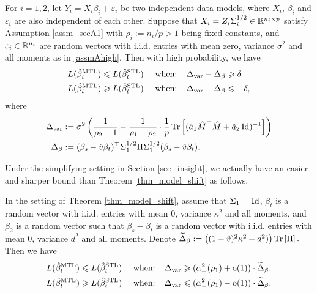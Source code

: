 \begin{theorem}\label{thm_model_shift}
For $i=1,2$, let $Y_i = X_i\beta_i + \varepsilon_i$ be two independent data models, where $X_i$, $\beta_i$ and $\varepsilon_i$ are also independent of each other. Suppose that $X_i=Z_i\Sigma_i^{1/2}\in \mathbb{R}^{n_i\times p}$ satisfy Assumption \ref{assm_secA1} with $\rho_i:=n_i/p>1$ being fixed constants, and ${\varepsilon}_i\in \mathbb{R}^{n_i}$ are random vectors with i.i.d. entries with mean zero, variance $\sigma^2$ and all moments as in \eqref{assmAhigh}. 
	Then with high probability, we have
	\begin{align}
	 	L(\hat{\beta}_{t}^{\text{MTL}}) \leqslant L(\hat{\beta}_t^{\text{STL}}) \quad \text{ when: } \ \ &\Delta_{\text{var}} - \Delta_{\beta} \geqslant   \delta \label{upper}\\
		L(\hat{\beta}_t^{\text{MTL}}) \geqslant L(\hat{\beta}_t^{\text{STL}}) \quad \text{ when: } \ \ &\Delta_{\text{var}} - \Delta_{\beta} \leqslant - \delta, \label{lower}
	\end{align}
	where
	\begin{align} %
		\Delta_{\vari} &\define {\sigma^2}\bigbrace{\frac{1}{\rho_2 - 1} -  \frac{1}{\rho_1 + \rho_2}\cdot \frac1p \bigtr{(\hat a_1 \hat M^{\top}\hat M + \hat a_2\id)^{-1}} } \label{Deltavarv} \\
		\Delta_{\beta} &\define (\beta_s - \hat{v}\beta_t)^{\top} \Sigma_1^{1/2} \Pi \Sigma_1^{1/2} (\beta_s - \hat{v}\beta_t). \label{Deltabetav}
	\end{align}
\end{theorem}

Under the simplifying setting in Section \ref{sec_insight}, we actually have an easier and sharper bound than Theorem \ref{thm_model_shift} as follows. 
\begin{lemma}\label{prop_model_shift_tight}
		In the setting of Theorem \ref{thm_model_shift}, assume that $\Sigma_1 =\operatorname{Id}$,
		$\beta_t$ is a random vector with i.i.d. entries with mean $0$, variance $\kappa^2$ and all moments, and $\beta_2$ is a random vector such that $\beta_s - \beta_t$ is a random vector with i.i.d. entries with mean $0$, variance $d^2$ and all moments. Denote
		$\widetilde \Delta_{\beta} := \left({(1 - \hat{v})^2 \kappa^2 + d^2)}\right) \operatorname{Tr}\left[\Pi\right].$
	Then we have
		\begin{align*}
			L(\hat{\beta}_t^{\text{MTL}}) \leqslant L(\hat{\beta}_t^{\text{STL}})\quad \text{ when: }\ \  & \Delta_{\text{var}} \geqslant  (\alpha_+^2(\rho_1)+\operatorname{o}(1))\cdot \widetilde \Delta_{\beta}, \\
			L(\hat{\beta}_t^{\text{MTL}}) \geqslant L(\hat{\beta}_t^{\text{STL}})\quad \text{ when: }\ \  & \Delta_{\text{var}} \leqslant (\alpha_-^2(\rho_1)-\operatorname{o}(1))\cdot \widetilde\Delta_{\beta}.
		\end{align*}
\end{lemma}

